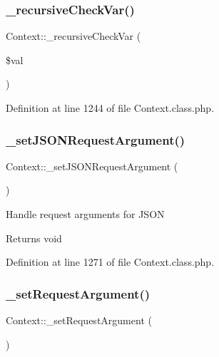 \subsubsection{\texorpdfstring{\+\_\+recursive\+Check\+Var()}{\_recursiveCheckVar()}}
{\footnotesize\ttfamily Context\+::\+\_\+recursive\+Check\+Var (\begin{DoxyParamCaption}\item[{}]{\$val }\end{DoxyParamCaption})}



Definition at line 1244 of file Context.\+class.\+php.

\hypertarget{classContext_ae07924273ca1b17fe67a7cf978d762fc}{}\label{classContext_ae07924273ca1b17fe67a7cf978d762fc} 
\subsubsection{\texorpdfstring{\+\_\+set\+J\+S\+O\+N\+Request\+Argument()}{\_setJSONRequestArgument()}}
{\footnotesize\ttfamily Context\+::\+\_\+set\+J\+S\+O\+N\+Request\+Argument (\begin{DoxyParamCaption}{ }\end{DoxyParamCaption})}

Handle request arguments for J\+S\+ON

\begin{DoxyReturn}{Returns}
void 
\end{DoxyReturn}


Definition at line 1271 of file Context.\+class.\+php.

\hypertarget{classContext_acfc274753d9687732458bfaba540c120}{}\label{classContext_acfc274753d9687732458bfaba540c120} 
\subsubsection{\texorpdfstring{\+\_\+set\+Request\+Argument()}{\_setRequestArgument()}}
{\footnotesize\ttfamily Context\+::\+\_\+set\+Request\+Argument (\begin{DoxyParamCaption}{ }\end{DoxyParamCaption})}

